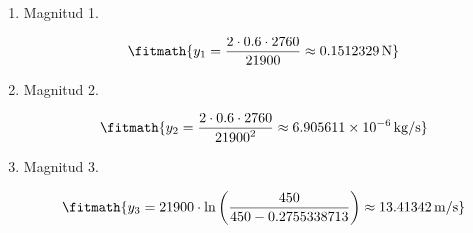 \begin{enumerate}

\item Magnitud 1.

\[\fitmath{y_{1}=\frac{2\cdot 0.6\cdot 2760}{21900}\approx 0.1512329\,\mathrm{N}}\]

\item Magnitud 2.

\[\fitmath{y_{2}=\frac{2\cdot 0.6\cdot 2760}{{21900}^{2}}\approx 6.905611\times10^{-6}\,\mathrm{kg/s}}\]

\item Magnitud 3.

\[\fitmath{y_{3}=21900\cdot \ln\left(\frac{450}{450-0.2755338713}\right)\approx 13.41342\,\mathrm{m/s}}\]

\end{enumerate}
